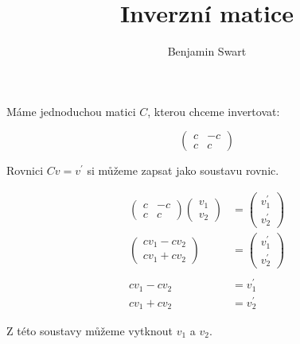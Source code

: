 \documentclass{article}
\title{Inverzní matice}
\author{Benjamin Swart}
\begin{document}
Máme jednoduchou matici $C$, kterou chceme invertovat:

\begin{equation*}
    \begin{pmatrix}
        c & -c \\
        c & c
    \end{pmatrix}
\end{equation*}

Rovnici $C v = v^\prime$ si můžeme zapsat jako soustavu rovnic.

\begin{align*}
    \begin{pmatrix}
        c & -c \\
        c & c
    \end{pmatrix}
    \begin{pmatrix}
        v_1 \\
        v_2
    \end{pmatrix}
                  & =
    \begin{pmatrix}
        v^\prime_1 \\
        v^\prime_2
    \end{pmatrix}               \\
    \begin{pmatrix}
        c v_1 - c v_2 \\
        c v_1 + c v_2
    \end{pmatrix}
                  & =
    \begin{pmatrix}
        v^\prime_1 \\
        v^\prime_2
    \end{pmatrix}               \\
    \\
    c v_1 - c v_2 & = v^\prime_1 \\
    c v_1 + c v_2 & = v^\prime_2
\end{align*}

Z této soustavy můžeme vytknout $v_1$ a $v_2$.
\end{document}
